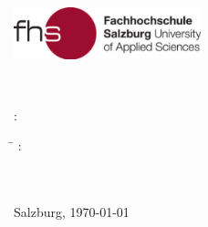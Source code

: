 \begin{titlepage}
\begin{center}
\Huge{
	{\textbf{\titlecap \ipapertype}}
}
\end{center}
\newpage

\thispagestyle{empty}

\hfill \includegraphics[height=1.5cm]{images/FHSLogo.pdf}

\vspace*{2cm}

\Large{
\MakeUppercase\ititletwo

\vspace*{1cm}

\MakeSentenceCase{\ipapertype}~\tattainment

\vspace*{0.5cm}

\textit{\tdegree}
}


\vspace*{1.5cm}
{\large
\tauthor: \iauthor
}
\vfill

{\normalsize
\tsubmitted

\vspace*{1cm}

\begin{tabbing}
\hspace*{1.4in}\=\kill
\texamined: \> \\ 
\isupervisorone \\
\isupervisortwo \\
\end{tabbing}

\vfill
{}
Salzburg, \today
{}
}
\end{titlepage}